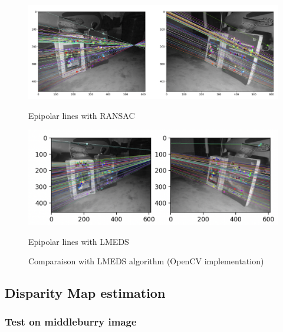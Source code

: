 \documentclass[10pt,twocolumn,letterpaper]{article}
\begin{document}
\begin{figure}
    \centering
    \begin{minipage}[t]{0.5\textwidth}
    \centerline{\includegraphics[width=\textwidth]{hard_ransac.png}}
    \centerline{Epipolar lines with RANSAC}
    \end{minipage}
    \hfill
    \begin{minipage}[t]{0.5\textwidth}   
    \centerline{\includegraphics[width=\textwidth]{hard_lmeds.png}}
    \centerline{Epipolar lines with LMEDS}
    \end{minipage}
    \caption{Comparaison with LMEDS algorithm (OpenCV implementation)}
    \label{fig:comp}
\end{figure}
\subsection{Disparity Map estimation}
\subsubsection{Test on middleburry image}
\end{document}
